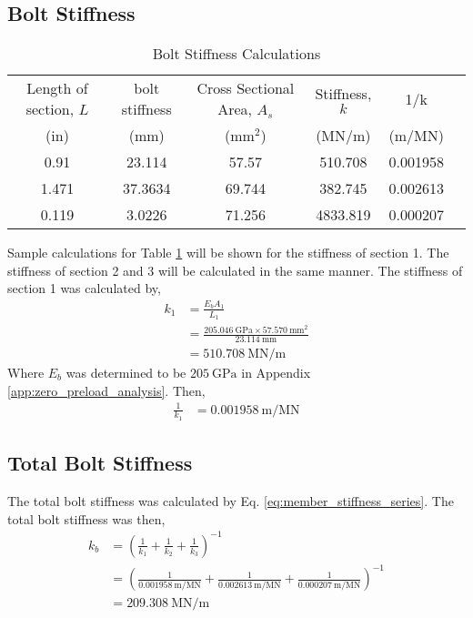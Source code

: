 \subsection{Bolt Stiffness}
\begin{table}[h]
    \centering
    \caption{Bolt Stiffness Calculations}
    \label{tab:bolt_stiffness}
    \begin{tabular}{cccccc}
    \toprule
    Length of section, $L$	& bolt stiffness	& Cross Sectional Area, $A_s$	& Stiffness, $k$	& 1/k \\
    (in)	& (mm)	& (mm$^2$)	& (MN/m)	& (m/MN) \\
    \midrule
    0.91	& 23.114	& 57.57 & 510.708 & 0.001958 \\
    1.471	& 37.3634	& 69.744 & 382.745 & 0.002613 \\
    0.119	& 3.0226	& 71.256 & 4833.819 & 0.000207 \\
    \bottomrule
    \end{tabular}
\end{table}
Sample calculations for Table \ref{tab:bolt_stiffness} will be shown for the stiffness of section 1. The stiffness of section 2 and 3 will be calculated in the same manner. The stiffness of section 1 was calculated by,
\begin{align*}
    k_1 &= \frac{E_b A_1}{L_1} \\
    &= \frac{\qty{205.046}{\giga\pascal} \times \qty{57.570}{\milli\meter\squared}}{\qty{23.114}{\milli\meter}} \\
    &= \qty{510.708}{\mega\newton\per\meter}
\end{align*}
Where $E_b$ was determined to be $\qty{205}{\giga\pascal}$ in Appendix \ref{app:zero_preload_analysis}. Then,
\begin{align*}
    \frac{1}{k_1} &= \qty{0.001958}{\meter\per\mega\newton}
\end{align*}

\subsection{Total Bolt Stiffness}
The total bolt stiffness was calculated by Eq. \ref{eq:member_stiffness_series}. The total bolt stiffness was then,
\begin{align*}
    k_b &= \left(\frac{1}{k_1} + \frac{1}{k_2} + \frac{1}{k_3}\right)^{-1} \\
    &= \left(\frac{1}{\qty{0.001958}{\meter\per\mega\newton}} + \frac{1}{\qty{0.002613}{\meter\per\mega\newton}} + \frac{1}{\qty{0.000207}{\meter\per\mega\newton}}\right)^{-1} \\
    &= \boxed{\qty{209.308}{\mega\newton\per\meter}}
\end{align*}